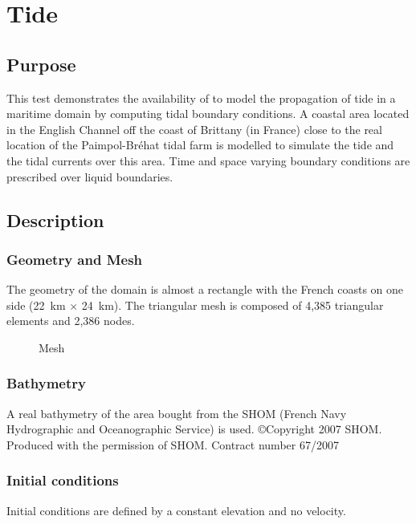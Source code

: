 \chapter{Tide}
%
%
\section{Purpose}

This test demonstrates the availability of  to model the
propagation of tide in a maritime domain by computing tidal
boundary conditions.
A coastal area located in the English Channel off the coast of
Brittany (in France) close to the real location of the Paimpol-Bréhat
tidal farm is modelled to simulate the tide and the tidal currents
over this area.
Time and space varying boundary conditions are prescribed over
liquid boundaries.
%
\section{Description}

\subsection{Geometry and Mesh}

The geometry of the domain is almost a rectangle with the French coasts on 
one side (22~km $\times$ 24~km).
The triangular mesh is composed of 4,385 triangular elements and 2,386 nodes.

\begin{figure}[H]
 \centering
  \caption{Mesh}\label{fig:tide:mesh}
\end{figure}

\subsection{Bathymetry}
%
A real bathymetry of the area bought from the SHOM (French Navy
Hydrographic and Oceanographic Service) is used.
\copyright Copyright 2007 SHOM. Produced with the permission of SHOM.
Contract number 67/2007

\subsection{Initial conditions}
%
Initial conditions are defined by a constant elevation and no velocity.
%
